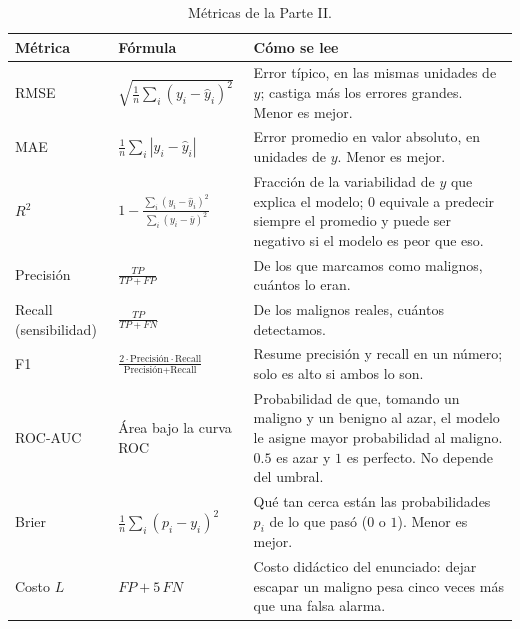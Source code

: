 \begin{table}[H]
\centering
\small
\renewcommand{\arraystretch}{1.5}
\begin{tabular}{l>{\centering\arraybackslash}p{4.3cm}>{\raggedright\arraybackslash}p{7.2cm}}
\toprule
Métrica & Fórmula & Cómo se lee \\
\midrule
RMSE & $\sqrt{\frac1n\sum_i (y_i-\hat y_i)^2}$ & Error típico, en las
mismas unidades de $y$; castiga más los errores grandes. Menor es mejor. \\
MAE & $\frac1n\sum_i |y_i-\hat y_i|$ & Error promedio en valor absoluto,
en unidades de $y$. Menor es mejor. \\
$R^2$ & $1-\frac{\sum_i (y_i-\hat y_i)^2}{\sum_i (y_i-\bar y)^2}$ &
Fracción de la variabilidad de $y$ que explica el modelo; $0$ equivale a
predecir siempre el promedio y puede ser negativo si el modelo es peor que
eso. \\
\midrule
Precisión & $\frac{TP}{TP+FP}$ & De los que marcamos como malignos,
cuántos lo eran. \\
Recall (sensibilidad) & $\frac{TP}{TP+FN}$ & De los malignos reales,
cuántos detectamos. \\
F1 & $\frac{2\cdot\text{Precisión}\cdot\text{Recall}}{\text{Precisión}+\text{Recall}}$
& Resume precisión y recall en un número; solo es alto si ambos lo son. \\
ROC-AUC & Área bajo la curva ROC & Probabilidad de que, tomando un maligno y un benigno al
azar, el modelo le asigne mayor probabilidad al maligno. $0.5$ es azar y
$1$ es perfecto. No depende del umbral. \\
Brier & $\frac1n\sum_i (p_i-y_i)^2$ & Qué tan cerca están las
probabilidades $p_i$ de lo que pasó ($0$ o $1$). Menor es mejor. \\
Costo $L$ & $FP+5\,FN$ & Costo didáctico del enunciado: dejar escapar un
maligno pesa cinco veces más que una falsa alarma. \\
\bottomrule
\end{tabular}
\caption{Métricas de la Parte II.}
\label{tab:metricas}
\end{table}
